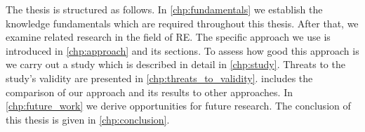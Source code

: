 The thesis is structured as follows.
In \cref{chp:fundamentals} we establish the knowledge fundamentals which are required throughout this thesis.
After that, we examine related research in the field of \ac{RE}.
The specific approach we use is introduced in \cref{chp:approach} and its sections.
To assess how good this approach is we carry out a study which is described in detail in \cref{chp:study}.
Threats to the study's validity are presented in \cref{chp:threats_to_validity}.
 includes the comparison of our approach and its results to other approaches.
In \cref{chp:future_work} we derive opportunities for future research.
The conclusion of this thesis is given in \cref{chp:conclusion}.

